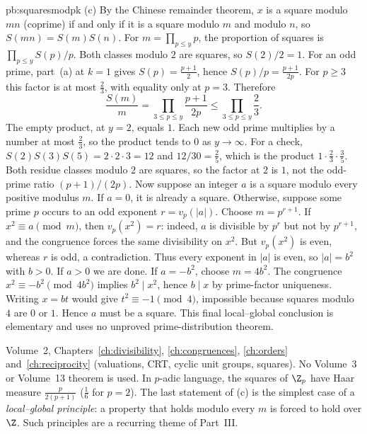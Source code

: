\begin{solution}{pb:squaresmodpk}
(c) By the Chinese remainder theorem, $x$ is a square modulo $mn$ (coprime) if and only if it is a square modulo $m$ and modulo $n$,
so $S(mn)=S(m)S(n)$. For $m=\prod_{p\le y}p$, the proportion of squares is $\prod_{p\le y}S(p)/p$. Both classes modulo $2$ are squares, so $S(2)/2=1$. For an odd prime, part~(a) at $k=1$ gives $S(p)=\frac{p+1}2$, hence $S(p)/p=\frac{p+1}{2p}$. For $p\ge3$ this factor is at most $\frac23$, with equality only at $p=3$. Therefore
\[
\frac{S(m)}m=\prod_{3\le p\le y}\frac{p+1}{2p}\le\prod_{3\le p\le y}\frac23.
\]
The empty product, at $y=2$, equals $1$. Each new odd prime multiplies by a number at most $\frac23$, so the product tends to $0$ as $y\to\infty$. For a check, $S(2)S(3)S(5)=2\cdot2\cdot3=12$ and $12/30=\frac25$, which is the product $1\cdot\frac23\cdot\frac35$. Both residue classes modulo $2$ are squares, so the factor at $2$ is $1$, not the odd-prime ratio $(p+1)/(2p)$. Now suppose an integer $a$ is a square modulo every positive modulus $m$.
If $a=0$, it is already a square. Otherwise, suppose some prime $p$
occurs to an odd exponent $r=v_p(|a|)$. Choose $m=p^{r+1}$.
If $x^2\equiv a\pmod m$, then $v_p(x^2)=r$: indeed,
$a$ is divisible by $p^r$ but not by $p^{r+1}$, and the congruence
forces the same divisibility on $x^2$. But $v_p(x^2)$ is even,
whereas $r$ is odd, a contradiction.
Thus every exponent in $|a|$ is even, so $|a|=b^2$ with $b>0$.
If $a>0$ we are done. If $a=-b^2$, choose $m=4b^2$.
The congruence $x^2\equiv-b^2\pmod{4b^2}$ implies $b^2\mid x^2$,
hence $b\mid x$ by prime-factor uniqueness. Writing $x=bt$
would give $t^2\equiv-1\pmod4$, impossible because squares
modulo $4$ are $0$ or $1$. Hence $a$ must be a square.
This final local--global conclusion is elementary and uses no
unproved prime-distribution theorem.

\tools Volume~2, Chapters~\ref{ch:divisibility}, \ref{ch:congruences},
\ref{ch:orders} and~\ref{ch:reciprocity} (valuations, CRT,
cyclic unit groups, squares). No Volume~3 or Volume~13 theorem is used.
\leads In $p$-adic language, the squares of $\Z_p$ have Haar measure $\frac p{2(p+1)}$ ($\frac16$ for $p=2$). The last statement of (c)
is the simplest case of a \emph{local--global principle}: a property that holds modulo every $m$ is forced
to hold over $\Z$. Such principles are a recurring theme of Part~III.
\end{solution}

